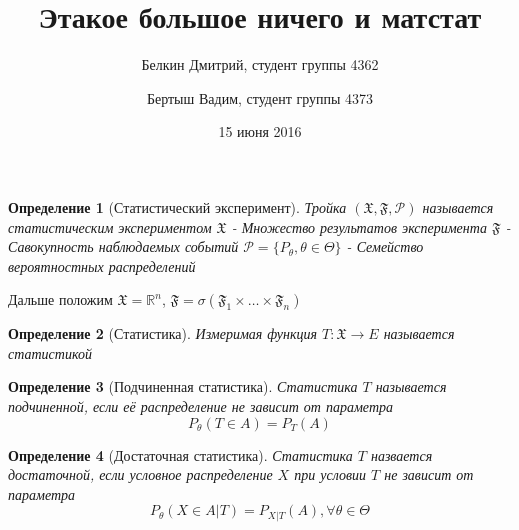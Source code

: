\documentclass{article}
\newcommand{\sP}{\mathcal{P}}
\newcommand{\sF}{\mathfrak{F}}
\newcommand{\sX}{\mathfrak{X}}
\newtheorem{definition}{Определение}
\begin{document}
\title{Этакое большое ничего и матстат}
\author{Белкин Дмитрий, студент группы 4362
\and Бертыш Вадим, студент группы 4373}
\date{15 июня 2016}
\maketitle
\newpage

\begin{definition}[Статистический эксперимент]
	Тройка $(\sX,\sF,\sP)$ называется статистическим экспериментом\newline
	$\sX$ - Множество результатов эксперимента\newline
	$\sF$ - Савокупность наблюдаемых событий\newline
	$\sP=\{P_\theta, \theta \in \Theta\}$ - Семейство вероятностных распределений
\end{definition}
Дальше положим $\sX=\mathbb{R}^n$, $\sF=\sigma(\sF_1 \times \dots \times \sF_n)$

\begin{definition}[Статистика]
	Измеримая функция $T:\sX \rightarrow E$ называется статистикой
\end{definition}

\begin{definition}[Подчиненная статистика]
	Статистика $T$ называется подчиненной, если её распределение не зависит от параметра
	$$P_\theta (T\in A) = P_T(A)$$
\end{definition}

\begin{definition}[Достаточная статистика]
	Статистика $T$ назвается достаточной, если условное распределение $X$ при условии $T$ не зависит от параметра
	$$P_\theta(X\in A|T) = P_{X|T}(A),\forall \theta \in \Theta $$
\end{definition}
\end{document}
